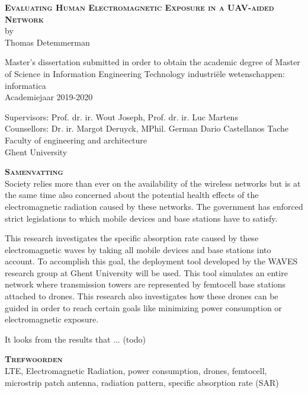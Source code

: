 \begin{center}
\textsc{\textbf{\Huge Evaluating Human Electromagnetic Exposure in a UAV-aided Network}}\\

by\\
Thomas Detemmerman

Master's dissertation submitted in order to obtain the academic degree of Master of Science in Information Engineering Technology
industri\"ele wetenschappen: informatica\\
Academiejaar 2019-2020

Supervisors: Prof. dr. ir. Wout Joseph, Prof. dr. ir. Luc Martens\\
Counsellors: Dr. ir. Margot Deruyck, MPhil. German Dario Castellanos Tache\\
Faculty of engineering and architecture\\
Ghent University
\end{center}

\textsc{\textbf{\LARGE Samenvatting}}\\

Society relies more than ever on the availability of the wireless networks but is at the same time also 
concerned about the potential health effects of the electromagnetic radiation caused by these networks.
The government has enforced strict legislations to which mobile devices and base stations have to satisfy.

This research investigates the specific absorption rate caused by these electromagnetic waves by taking all mobile devices and base stations into account.
To accomplish this goal, the deployment tool developed by the WAVES research group at Ghent University will be used. This tool simulates an entire network 
where transmission towers are represented by femtocell base stations attached to drones. This research also investigates how these drones can be guided 
in order to reach certain goals like minimizing power consumption or electromagnetic exposure.

It looks from the results that ... (todo)



\textsc{\textbf{\LARGE Trefwoorden}}\\

LTE, Electromagnetic Radiation, power consumption, drones, femtocell, microstrip patch antenna, radiation pattern, specific absorption rate (SAR)
